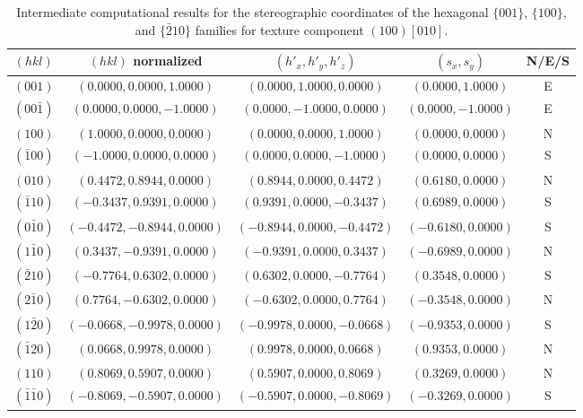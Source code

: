 \begin{table}[t!]
\centering\leavevmode
{\small
\begin{tabular}{|c|c|c|c|c|}
\hline
$(hkl)$ & $(hkl)$ normalized & $(h'_x,h'_y,h'_z)$ & $(s_x,s_y)$ & N/E/S \\
\hline\hline
$(001)$ & $( 0.0000, 0.0000, 1.0000)$ & $( 0.0000, 1.0000, 0.0000)$ & $( 0.0000, 1.0000)$ & E \\
$(00\bar{1})$ & $( 0.0000, 0.0000,-1.0000)$ & $( 0.0000,-1.0000, 0.0000)$ & $( 0.0000,-1.0000)$ & E \\
\hline
$(100)$ & $( 1.0000, 0.0000, 0.0000)$ & $( 0.0000, 0.0000, 1.0000)$ & $( 0.0000, 0.0000)$ & N \\
$(\bar{1}00)$ & $(-1.0000, 0.0000, 0.0000)$ & $( 0.0000, 0.0000,-1.0000)$ & $( 0.0000, 0.0000)$ & S \\
$(010)$ & $( 0.4472, 0.8944, 0.0000)$ & $( 0.8944, 0.0000, 0.4472)$ & $( 0.6180, 0.0000)$ & N \\
$(\bar{1}10)$ & $(-0.3437, 0.9391, 0.0000)$ & $( 0.9391, 0.0000,-0.3437)$ & $( 0.6989, 0.0000)$ & S \\
$(0\bar{1}0)$ & $(-0.4472,-0.8944, 0.0000)$ & $(-0.8944, 0.0000,-0.4472)$ & $(-0.6180, 0.0000)$ & S \\
$(1\bar{1}0)$ & $( 0.3437,-0.9391, 0.0000)$ & $(-0.9391, 0.0000, 0.3437)$ & $(-0.6989, 0.0000)$ & N \\
\hline
$(\bar{2}10)$ & $(-0.7764, 0.6302, 0.0000)$ & $( 0.6302, 0.0000,-0.7764)$ & $( 0.3548, 0.0000)$ & S \\
$(2\bar{1}0)$ & $( 0.7764,-0.6302, 0.0000)$ & $(-0.6302, 0.0000, 0.7764)$ & $(-0.3548, 0.0000)$ & N \\
$(1\bar{2}0)$ & $(-0.0668,-0.9978, 0.0000)$ & $(-0.9978, 0.0000,-0.0668)$ & $(-0.9353, 0.0000)$ & S \\
$(\bar{1}20)$ & $( 0.0668, 0.9978, 0.0000)$ & $( 0.9978, 0.0000, 0.0668)$ & $( 0.9353, 0.0000)$ & N \\
$(110)$ & $( 0.8069, 0.5907, 0.0000)$ & $( 0.5907, 0.0000, 0.8069)$ & $( 0.3269, 0.0000)$ & N \\
$(\bar{1}\bar{1}0)$ & $(-0.8069,-0.5907, 0.0000)$ & $(-0.5907, 0.0000,-0.8069)$ & $(-0.3269, 0.0000)$ & S \\
\hline
\end{tabular}}
\caption{\label{\chabbr:tb:PFcompMg}Intermediate computational results for the stereographic coordinates of the hexagonal $\{001\}$, $\{100\}$, and $\{\bar{2}10\}$ families for texture component  $(100)[010]$.}
\end{table}


